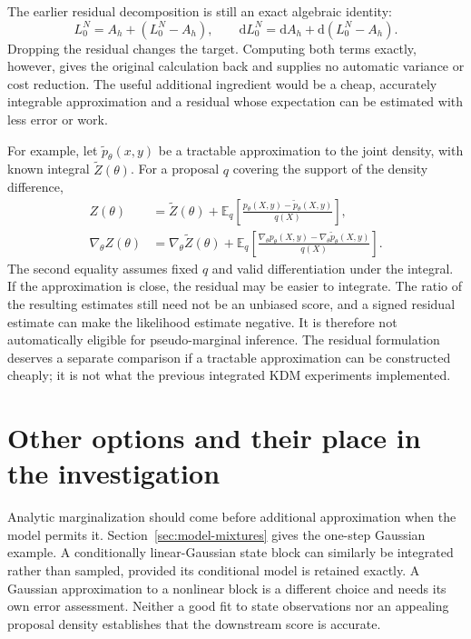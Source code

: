 \documentclass[11pt]{article}
\newcommand{\dd}{\mathrm{d}}
\begin{document}
The earlier residual decomposition is still an exact algebraic identity:
\begin{equation}
 L_0^N=A_h+\left(L_0^N-A_h\right),\qquad
 \dd L_0^N=\dd A_h+\dd\left(L_0^N-A_h\right).
 \label{eq:residual}
\end{equation}
Dropping the residual changes the target. Computing both terms exactly,
however, gives the original calculation back and supplies no automatic
variance or cost reduction. The useful additional ingredient would be a
cheap, accurately integrable approximation and a residual whose expectation
can be estimated with less error or work.

For example, let $\widetilde p_\theta(x,y)$ be a tractable approximation to
the joint density, with known integral $\widetilde Z(\theta)$. For a proposal
$q$ covering the support of the density difference,
\begin{align}
 Z(\theta)&=\widetilde Z(\theta)
 +\mathbb E_q\!\left[
       \frac{p_\theta(X,y)-\widetilde p_\theta(X,y)}{q(X)}\right],\\
 \nabla_\theta Z(\theta)&=\nabla_\theta\widetilde Z(\theta)
 +\mathbb E_q\!\left[
       \frac{\nabla_\theta p_\theta(X,y)
             -\nabla_\theta\widetilde p_\theta(X,y)}{q(X)}\right].
 \label{eq:joint-surrogate-residual}
\end{align}
The second equality assumes fixed $q$ and valid differentiation under the
integral. If the approximation is close, the residual may be easier to
integrate. The ratio of the resulting estimates still need not be an unbiased
score, and a signed residual estimate can make the likelihood estimate
negative. It is therefore not automatically eligible for pseudo-marginal
inference. The residual formulation deserves a separate comparison if a
tractable approximation can be constructed cheaply; it is not what the
previous integrated KDM experiments implemented.


\section{Other options and their place in the investigation}
\label{sec:alternatives}

Analytic marginalization should come before additional approximation when
the model permits it. Section~\ref{sec:model-mixtures} gives the one-step
Gaussian example. A conditionally linear-Gaussian state block can similarly
be integrated rather than sampled, provided its conditional model is retained
exactly. A Gaussian approximation to a nonlinear block is a different choice
and needs its own error assessment. Neither a good fit to state observations
nor an appealing proposal density establishes that the downstream score is
accurate.
\end{document}
